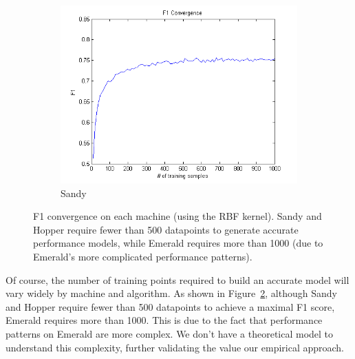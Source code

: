 \begin{figure}[t]
\begin{subfigure}[t]{0.33\textwidth}
            \includegraphics[width=\textwidth]{figures/F1_convergence_sandy.png}
            \caption{Sandy}
            \label{f:F1_sandy}
        \end{subfigure}
        \caption{F1 convergence on each machine (using the RBF kernel). Sandy and Hopper require fewer than 500 datapoints to generate accurate performance models, while Emerald requires more than 1000 (due to Emerald's more complicated performance patterns).}
    \label{fig:convergence}
\end{figure}

Of course, the number of training points required to build an accurate model will vary widely by machine and algorithm.
As shown in Figure~\ref{fig:convergence}, although Sandy and Hopper require fewer than 500 datapoints to achieve a maximal F1 score, Emerald requires more than 1000.
This is due to the fact that performance patterns on Emerald are more complex.
We don't have a theoretical model to understand this complexity, further validating the value our empirical approach.


